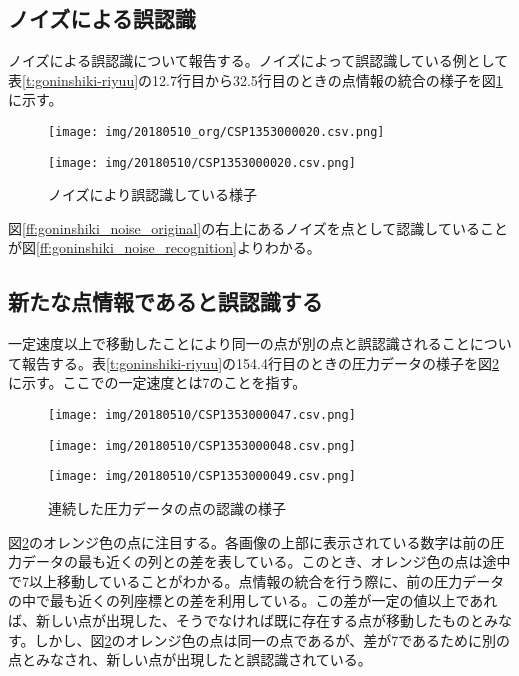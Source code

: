 \subsection{ノイズによる誤認識}
ノイズによる誤認識について報告する。ノイズによって誤認識している例として表\ref{t:goninshiki-riyuu}の12.7行目から32.5行目のときの点情報の統合の様子を図\ref{f:goninshii_noise}に示す。
\begin{figure}[H]
	\centering
	\begin{minipage}[b]{0.45\linewidth}
		\centering
		\texttt{[image: img/20180510\_org/CSP1353000020.csv.png]}
		\label{ff:goninshiki_noise_original}
	\end{minipage}
	\begin{minipage}[b]{0.45\linewidth}
		\centering
		\texttt{[image: img/20180510/CSP1353000020.csv.png]}
		\label{ff:goninshiki_noise_recognition}
	\end{minipage}
	\caption{ノイズにより誤認識している様子}
	\label{f:goninshii_noise}
\end{figure}
図\ref{ff:goninshiki_noise_original}の右上にあるノイズを点として認識していることが図\ref{ff:goninshiki_noise_recognition}よりわかる。

\subsection{新たな点情報であると誤認識する}
一定速度以上で移動したことにより同一の点が別の点と誤認識されることについて報告する。表\ref{t:goninshiki-riyuu}の154.4行目のときの圧力データの様子を図\ref{ff:goninshiki_velocity}に示す。ここでの一定速度とは7のことを指す。
\begin{figure}[H]
	\centering
	\begin{minipage}[b]{0.3\linewidth}
		\centering
		\texttt{[image: img/20180510/CSP1353000047.csv.png]}
	\end{minipage}
	\begin{minipage}[b]{0.3\linewidth}
		\centering
		\texttt{[image: img/20180510/CSP1353000048.csv.png]}
	\end{minipage}
	\begin{minipage}[b]{0.3\linewidth}
		\centering
		\texttt{[image: img/20180510/CSP1353000049.csv.png]}
	\end{minipage}
	\caption{連続した圧力データの点の認識の様子}
	\label{ff:goninshiki_velocity}
\end{figure}
図\ref{ff:goninshiki_velocity}のオレンジ色の点に注目する。各画像の上部に表示されている数字は前の圧力データの最も近くの列との差を表している。このとき、オレンジ色の点は途中で7以上移動していることがわかる。点情報の統合を行う際に、前の圧力データの中で最も近くの列座標との差を利用している。この差が一定の値以上であれば、新しい点が出現した、そうでなければ既に存在する点が移動したものとみなす。しかし、図\ref{ff:goninshiki_velocity}のオレンジ色の点は同一の点であるが、差が7であるために別の点とみなされ、新しい点が出現したと誤認識されている。

